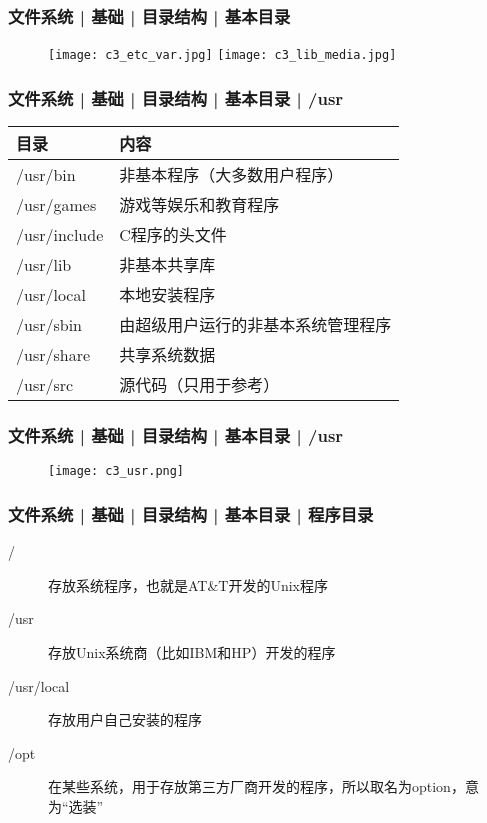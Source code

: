 \begin{frame}
  \frametitle{文件系统 | 基础 | 目录结构 | 基本目录}
  \begin{figure}
    \centering
    \texttt{[image: c3\_etc\_var.jpg]}
    \texttt{[image: c3\_lib\_media.jpg]}
  \end{figure}
\end{frame}

\begin{frame}
  \frametitle{文件系统 | 基础 | 目录结构 | 基本目录 | \alert{/usr}}
  \begin{table}
    \centering
    \begin{tabular}{ll}
      \hline
      \rowcolor{blue!50}目录 & 内容\\
      \hline
      \alert{/usr/bin} & 非基本程序（大多数用户程序）\\
      /usr/games & 游戏等娱乐和教育程序\\
      /usr/include & C程序的头文件\\
      /usr/lib & 非基本共享库\\
      \alert{/usr/local} & 本地安装程序\\
      /usr/sbin & 由超级用户运行的非基本系统管理程序\\
      /usr/share & 共享系统数据\\
      /usr/src & 源代码（只用于参考）\\
      \hline
    \end{tabular}
  \end{table}
\end{frame}

\begin{frame}
  \frametitle{文件系统 | 基础 | 目录结构 | 基本目录 | /usr}
  \begin{figure}
    \centering
    \texttt{[image: c3\_usr.png]}
  \end{figure}
\end{frame}

\begin{frame}
  \frametitle{文件系统 | 基础 | 目录结构 | 基本目录 | 程序目录}
  \begin{description}
    \item[/] 存放系统程序，也就是AT\&T开发的Unix程序
    \item[/usr] 存放Unix系统商（比如IBM和HP）开发的程序
    \item[/usr/local] 存放用户自己安装的程序
    \item[/opt] 在某些系统，用于存放第三方厂商开发的程序，所以取名为option，意为“选装”
  \end{description}
\end{frame}

